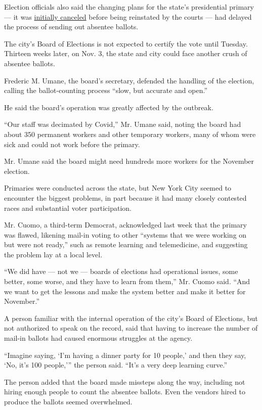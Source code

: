 Election officials also said the changing plans for the state's
presidential primary --- it was
\href{https://www.nytimes.com/2020/04/27/us/politics/democratic-primary-canceled-coronavirus.html}{initially
canceled} before being reinstated by the courts --- had delayed the
process of sending out absentee ballots.

The city's Board of Elections is not expected to certify the vote until
Tuesday. Thirteen weeks later, on Nov. 3, the state and city could face
another crush of absentee ballots.

Frederic M. Umane, the board's secretary, defended the handling of the
election, calling the ballot-counting process ``slow, but accurate and
open.''

He said the board's operation was greatly affected by the outbreak.

``Our staff was decimated by Covid,'' Mr. Umane said, noting the board
had about 350 permanent workers and other temporary workers, many of
whom were sick and could not work before the primary.

Mr. Umane said the board might need hundreds more workers for the
November election.

Primaries were conducted across the state, but New York City seemed to
encounter the biggest problems, in part because it had many closely
contested races and substantial voter participation.

Mr. Cuomo, a third-term Democrat, acknowledged last week that the
primary was flawed, likening mail-in voting to other ``systems that we
were working on but were not ready,'' such as remote learning and
telemedicine, and suggesting the problem lay at a local level.

``We did have --- not we --- boards of elections had operational issues,
some better, some worse, and they have to learn from them,'' Mr. Cuomo
said. ``And we want to get the lessons and make the system better and
make it better for November.''

A person familiar with the internal operation of the city's Board of
Elections, but not authorized to speak on the record, said that having
to increase the number of mail-in ballots had caused enormous struggles
at the agency.

``Imagine saying, `I'm having a dinner party for 10 people,' and then
they say, `No, it's 100 people,''' the person said. ``It's a very deep
learning curve.''

The person added that the board made missteps along the way, including
not hiring enough people to count the absentee ballots. Even the vendors
hired to produce the ballots seemed overwhelmed.

